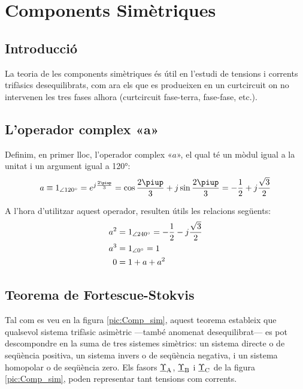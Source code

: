 \chapter{Components Simètriques}  \label{sec:ch-comp-sim}

\section{Introducció}
La teoria de les components simètriques és útil en l'estudi de
tensions i corrents trifàsics
 desequilibrats, com ara els que es produeixen en un curtcircuit on no intervenen les tres
 fases alhora (curtcircuit fase-terra, fase-fase, etc.).

\section{L'operador complex «$\boldsymbol{a}$»}

Definim, en primer lloc, l'operador complex «$a$», el qual té un mòdul
igual a la unitat i un argument igual a \ang{120}: \begin{equation}
   a \equiv \numpd{1}{120} = e^{j\frac{2\piup}{3}} =
   \cos \frac{2\piup}{3} + j \sin \frac{2\piup}{3} = - \frac{1}{2} + j \frac{\sqrt{3}}{2}
\end{equation}

A l'hora d'utilitzar aquest operador, resulten útils les relacions
següents:
\begin{subequations}
\begin{align}
    a^2 &= \num{1}_{\angle\ang{240}}= - \frac{1}{2} - j \frac{\sqrt{3}}{2} \\
    a^3 &= \num{1}_{\angle\ang{0}} = 1 \\
    0 &= 1+ a + a^2
 \end{align}
\end{subequations}

\section{\texorpdfstring{Teorema de Fortescue-Stokvis}{Teorema de Fortescue-Stokvis}}

Tal com es veu en la figura \vref{pic:Comp_sim}, aquest teorema
estableix que qualsevol sistema trifàsic asimètric ---també anomenat
desequilibrat---  es pot descompondre  en la suma de tres sistemes
simètrics: un sistema directe o de seqüència positiva, un sistema
invers o de seqüència negativa, i un sistema homopolar o de
seqüència zero. Els fasors $\underline{\Upsilon}_\mathrm{A}$,
$\underline{\Upsilon}_\mathrm{B}$ i $\underline{\Upsilon}_\mathrm{C}$ de la figura \vref{pic:Comp_sim}, poden representar tant
tensions com corrents.

